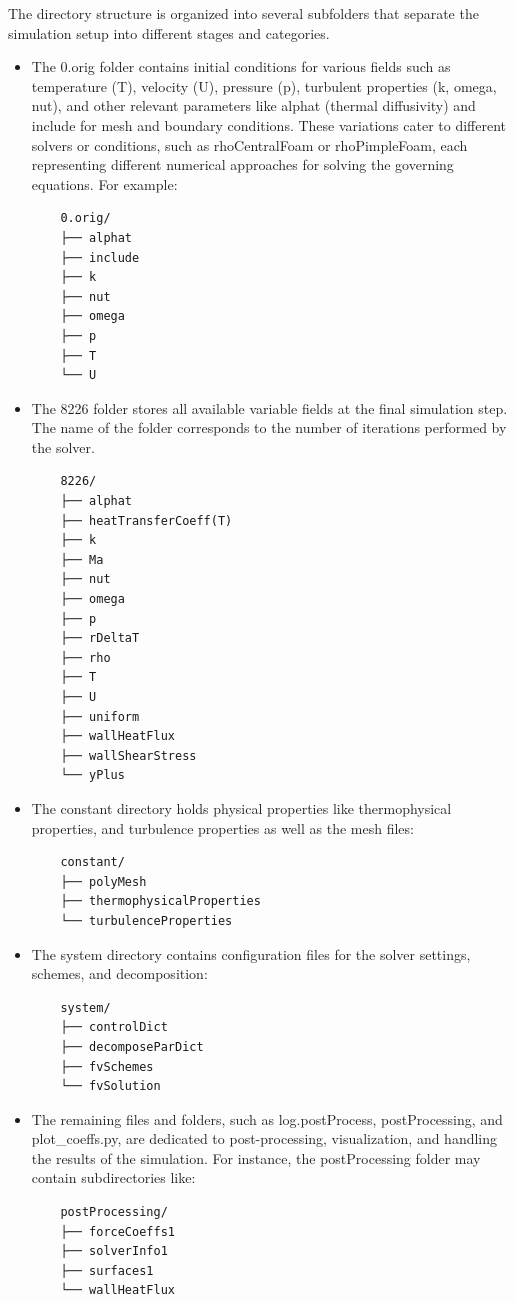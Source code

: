 \documentclass[12pt]{article}
\begin{document}
The directory structure is organized into several subfolders that separate the simulation setup into different stages and categories.

\begin{itemize}
    \item The 0.orig folder contains initial conditions for various fields such as temperature (T), velocity (U), pressure (p), turbulent properties (k, omega, nut), and other relevant parameters like alphat (thermal diffusivity) and include for mesh and boundary conditions. These variations cater to different solvers or conditions, such as rhoCentralFoam or rhoPimpleFoam, each representing different numerical approaches for solving the governing equations. For example:
    
    \begin{verbatim}
    0.orig/
    ├── alphat
    ├── include
    ├── k
    ├── nut
    ├── omega
    ├── p
    ├── T
    └── U
    \end{verbatim}
    
    \item The 8226 folder stores all available variable fields at the final simulation step. The name of the folder corresponds to the number of iterations performed by the solver.
    
    \begin{verbatim}
    8226/
    ├── alphat
    ├── heatTransferCoeff(T)
    ├── k
    ├── Ma
    ├── nut
    ├── omega
    ├── p
    ├── rDeltaT
    ├── rho
    ├── T
    ├── U
    ├── uniform
    ├── wallHeatFlux
    ├── wallShearStress
    └── yPlus
    \end{verbatim}
    
    \item The constant directory holds physical properties like thermophysical properties, and turbulence properties as well as the mesh files:
    
    \begin{verbatim}
    constant/
    ├── polyMesh
    ├── thermophysicalProperties
    └── turbulenceProperties
    \end{verbatim}
    
    \item The system directory contains configuration files for the solver settings, schemes, and decomposition:
    
    \begin{verbatim}
    system/
    ├── controlDict
    ├── decomposeParDict
    ├── fvSchemes
    └── fvSolution
    \end{verbatim}
    
    \item The remaining files and folders, such as log.postProcess, postProcessing, and plot\_coeffs.py, are dedicated to post-processing, visualization, and handling the results of the simulation. For instance, the postProcessing folder may contain subdirectories like:
    
    \begin{verbatim}
    postProcessing/
    ├── forceCoeffs1
    ├── solverInfo1
    ├── surfaces1
    └── wallHeatFlux
    \end{verbatim}
    
\end{itemize}
\end{document}
